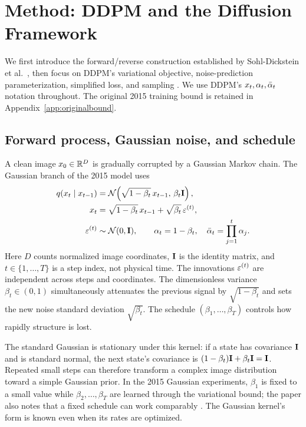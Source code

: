 \section{Method: DDPM and the Diffusion Framework}\label{sec:ddpm}\label{sec:method}
We first introduce the forward/reverse construction established by
Sohl-Dickstein et al.\ \cite{sohl2015diffusion}, then focus on DDPM's
variational objective, noise-prediction parameterization, simplified loss,
and sampling \cite{ho2020ddpm}. We use DDPM's $x_t,\alpha_t,\bar{\alpha}_t$
notation throughout. The original 2015 training bound is retained in
Appendix~\ref{app:originalbound}.

\subsection{Forward process, Gaussian noise, and schedule}\label{sec:forward}
A clean image $x_0\in\mathbb{R}^D$ is gradually corrupted by a Gaussian Markov
chain. The Gaussian branch of the 2015 model uses
\cite[Sec.~2.1, Table~C.1]{sohl2015diffusion}
\begin{align}
q(x_t\mid x_{t-1})
 &=\mathcal{N}\!\left(\sqrt{1-\beta_t}\,x_{t-1},\,\beta_t\mathbf{I}\right),\label{eq:forward}\\
x_t&=\sqrt{1-\beta_t}\,x_{t-1}+\sqrt{\beta_t}\,\varepsilon^{(t)},\nonumber\\
\varepsilon^{(t)}&\sim\mathcal{N}(0,\mathbf{I}),\qquad
\alpha_t=1-\beta_t,\quad\bar{\alpha}_t=\prod_{j=1}^t\alpha_j.\nonumber
\end{align}
Here $D$ counts normalized image coordinates, $\mathbf{I}$ is the identity
matrix, and $t\in\{1,\ldots,T\}$ is a step index, not physical time.
The innovations $\varepsilon^{(t)}$ are independent across steps and coordinates.
The dimensionless variance $\beta_t\in(0,1)$ simultaneously attenuates
the previous signal by $\sqrt{1-\beta_t}$ and sets the new noise standard
deviation $\sqrt{\beta_t}$. The schedule $(\beta_1,\ldots,\beta_T)$
controls how rapidly structure is lost.

The standard Gaussian is stationary under this kernel: if a state has
covariance $\mathbf{I}$ and is standard normal, the next state's covariance is
$(1-\beta_t)\mathbf{I}+\beta_t\mathbf{I}=\mathbf{I}$. Repeated small steps can therefore
transform a complex image distribution toward a simple Gaussian prior.
In the 2015 Gaussian experiments, $\beta_1$ is fixed to a small value
while $\beta_2,\ldots,\beta_T$ are learned through the variational bound;
the paper also notes that a fixed schedule can work comparably
\cite[Sec.~2.4.1]{sohl2015diffusion}. The Gaussian kernel's form is known
even when its rates are optimized.

